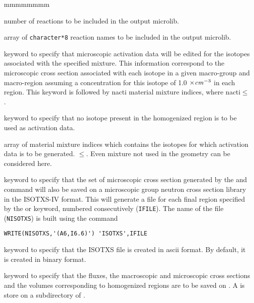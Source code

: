 \begin{ListeDeDescription}{mmmmmmmm}
\item[\dusa{nreac}] number of reactions to be included in the output microlib.

\item[\dusa{HREAC}] array of {\tt character*8} reaction names to be included in the output microlib.

\item[\moc{ACTI}] keyword to specify that microscopic activation
data will be edited for the isotopes associated with the specified mixture. This
information correspond to the microscopic cross section associated with each
isotope in a given macro-group and macro-region assuming a concentration
for this isotope of 1.0 $\times{\it cm}^{-3}$ in each region. This keyword is
followed by nacti material mixture indices, where
nacti$\le$.

\item[\moc{NONE}] keyword to specify that no isotope present in the
homogenized region is to be used as activation data.

\item[\dusa{imixa}] array of material mixture indices which contains the
isotopes for which activation data is to be generated.
$\le$. Even mixture not used in the geometry 
can be considered here.

\item[\moc{ISOTXS}] keyword to specify that the set of microscopic cross
section generated by the  and  command will also
be saved on a microscopic group neutron cross section library in the ISOTXS-IV
format. This will generate a file for each final region specified by the
 or  keyword, numbered consecutively ({\tt IFILE}). The name
of the file ({\tt NISOTXS}) is built using the command 

\begin{verbatim}
WRITE(NISOTXS,'(A6,I6.6)') 'ISOTXS',IFILE
\end{verbatim}

\item[\moc{ASCII}] keyword to specify that the ISOTXS file is created in ascii format.
By  default, it is created in binary format.

\item[\moc{SAVE}] keyword to specify that the fluxes, the macroscopic and
microscopic cross sections and the volumes corresponding to homogenized regions
are to be saved on . A  is store on a subdirectory
of .


\end{ListeDeDescription}
